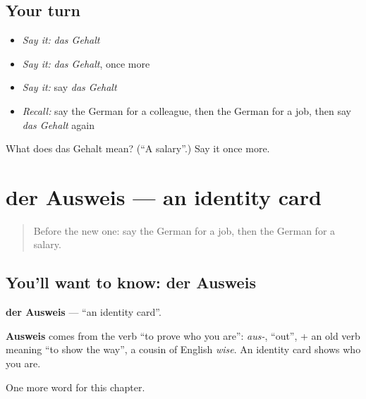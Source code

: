 \subsection*{Your turn}
\begin{itemize}
\raggedright
  \item \emph{Say it:} \emph{das Gehalt}
  \item \emph{Say it:} \emph{das Gehalt}, once more
  \item \emph{Say it:} say \emph{das Gehalt}
  \item \emph{Recall:} say the German for a colleague, then the German for a job, then say \emph{das Gehalt} again
\end{itemize}

\begin{tcolorbox}[breakable,colback=teal!4,colframe=teal!35!black,title={Before you move on}]
What does das Gehalt mean? (\textquotedblleft{}A salary\textquotedblright{}.) Say it once more.
\end{tcolorbox}
\section[der Ausweis]{der Ausweis — an identity card}

\label{lesson:GE-C155-ausweis}



\begin{quote}
Before the new one: say the German for a job, then the German for a salary.
\end{quote}

\subsection*{You'll want to know: der Ausweis}
\textbf{der Ausweis} — \textquotedblleft{}an identity card\textquotedblright{}.

\begin{cousinweb}
\textbf{Ausweis} comes from the verb \textquotedblleft{}to prove who you are\textquotedblright{}: \emph{aus-}, \textquotedblleft{}out\textquotedblright{}, + an old verb meaning \textquotedblleft{}to show the way\textquotedblright{}, a cousin of English \emph{wise}. An identity card shows who you are.
\end{cousinweb}

\begin{grammarlens}[title={What you've built}]
One more word for this chapter.
\end{grammarlens}

